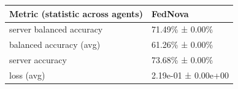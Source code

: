 \begin{tabular}{ll}
\hline
 Metric (statistic across agents)   & FedNova             \\
\hline
 server balanced accuracy           & 71.49\% ± 0.00\%      \\
 balanced accuracy (avg)            & 61.26\% ± 0.00\%      \\
 server accuracy                    & 73.68\% ± 0.00\%      \\
 loss (avg)                         & 2.19e-01 ± 0.00e+00 \\
\hline
\end{tabular}
